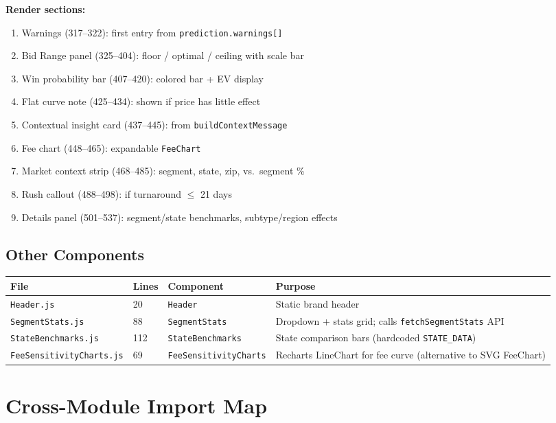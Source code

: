 \documentclass[11pt,a4paper]{article}
\newcommand{\file}[1]{\texttt{\color{gssblue!70!black}#1}}
\newcommand{\func}[1]{\texttt{\color{gssgreen!80!black}#1}}
\newcommand{\cls}[1]{\texttt{\color{uipurple}#1}}
\begin{document}
\textbf{Render sections:}
\begin{enumerate}[leftmargin=2em]
    \item Warnings (317--322): first entry from \texttt{prediction.warnings[]}
    \item Bid Range panel (325--404): floor / optimal / ceiling with scale bar
    \item Win probability bar (407--420): colored bar + EV display
    \item Flat curve note (425--434): shown if price has little effect
    \item Contextual insight card (437--445): from \func{buildContextMessage}
    \item Fee chart (448--465): expandable \cls{FeeChart}
    \item Market context strip (468--485): segment, state, zip, vs.\ segment \%
    \item Rush callout (488--498): if turnaround $\leq$ 21 days
    \item Details panel (501--537): segment/state benchmarks, subtype/region effects
\end{enumerate}

\subsection{Other Components}

\begin{longtable}{l l l p{5.5cm}}
\toprule
\textbf{File} & \textbf{Lines} & \textbf{Component} & \textbf{Purpose} \\
\midrule
\endhead
\file{Header.js} & 20 & \cls{Header} & Static brand header \\
\file{SegmentStats.js} & 88 & \cls{SegmentStats} & Dropdown + stats grid; calls \func{fetchSegmentStats} API \\
\file{StateBenchmarks.js} & 112 & \cls{StateBenchmarks} & State comparison bars (hardcoded \texttt{STATE\_DATA}) \\
\file{FeeSensitivityCharts.js} & 69 & \cls{FeeSensitivityCharts} & Recharts LineChart for fee curve (alternative to SVG FeeChart) \\
\bottomrule
\end{longtable}

\section{Cross-Module Import Map}
\label{sec:imports}
\end{document}
